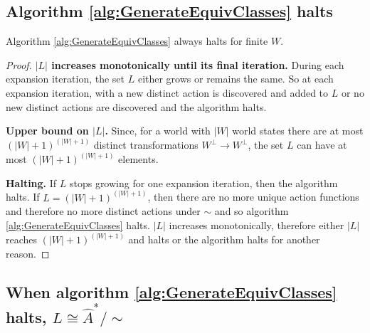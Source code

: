 \subsection{Algorithm \ref{alg:GenerateEquivClasses} halts}

\begin{proposition}
    Algorithm \ref{alg:GenerateEquivClasses} always halts for finite $W$.
\end{proposition}
\begin{proof}
    \textbf{$|L|$ increases monotonically until its final iteration.}
    During each expansion iteration, the set $L$ either grows or remains the same.
    So at each expansion iteration, with a new distinct action is discovered and added to $L$ or no new distinct actions are discovered and the algorithm halts.

    \textbf{Upper bound on $|L|$.}
    Since, for a world with $|W|$ world states there are at most $(|W| + 1)^(|W| + 1)$ distinct transformations $W^{\bot} \to W^{\bot}$, the set $L$ can have at most $(|W| + 1)^(|W| + 1)$ elements.

    \textbf{Halting.}
    If $L$ stops growing for one expansion iteration, then the algorithm halts.
    If $L = (|W| + 1)^(|W| + 1)$, then there are no more unique action functions and therefore no more distinct actions under $\sim$ and so  algorithm \ref{alg:GenerateEquivClasses} halts.
    $|L|$ increases monotonically, therefore either $|L|$ reaches $(|W| + 1)^(|W| + 1)$ and halts or the algorithm halts for another reason.
\end{proof}

\subsection{When algorithm \ref{alg:GenerateEquivClasses} halts, $L \cong \hat{A}^{*}/\sim$}

